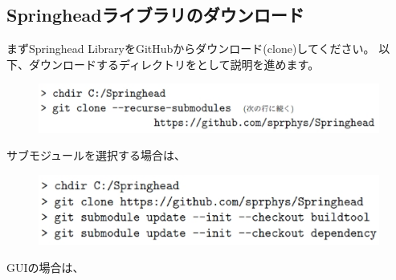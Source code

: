 \subsection{Springheadライブラリのダウンロード}
\label{subsec:Download}

\noindent
まずSpringhead LibraryをGitHubからダウンロード(clone)してください。
以下、ダウンロードするディレクトリを\SprTop{}として説明を進めます。

\medskip
\ifLwarp
	\begin{figure}[h]
	    \begin{center}
	    \includegraphics[width=\textwidth]{fig/command-2-1-a.eps}
	    \end{center}
	    \label{fig:DownloadTree}
	\end{figure}
\else
\begin{narrow}[15pt]
\end{narrow}
\fi
\medskip
サブモジュールを選択する場合は、
\ifLwarp
	\begin{figure}[h]
	    \begin{center}
	    \includegraphics[width=\textwidth]{fig/command-2-1-b.eps}
	    \end{center}
	    \label{fig:DownloadTree}
	\end{figure}
\else
\begin{narrow}[15pt]
\end{narrow}
\fi
\medskip
GUIの場合は、
